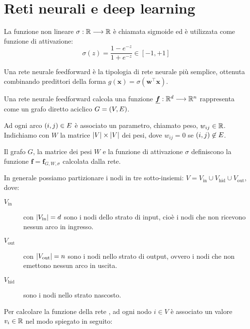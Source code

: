\documentclass[\main/main.tex]{subfiles}
\begin{document}
\chapter{Reti neurali e deep learning}
\begin{multicols}{2}
\begin{definition}[Sigmoide]
    La funzione non lineare \(\sigma:\mathbb{R}\longrightarrow \mathbb{R}\) è chiamata sigmoide ed è utilizzata come funzione di attivazione:
    \[\sigma(z)=\frac{1-e^{-z}}{1+e^{-z}} \in[-1,+1]\]
\end{definition}
\begin{definition}
    Una rete neurale feedforward è la tipologia di rete neurale più semplice, ottenuta combinando predittori della forma \(g(\boldsymbol{x})=\sigma\left(\boldsymbol{w}^{\top} \boldsymbol{x}\right)\).
    
    Una rete neurale feedforward calcola una funzione \(\funcdef{\bm{f}}{\R^d}{\R^n}\) rappresenta come un grafo diretto aciclico \(G = \left(V,E\right)\).
    
    Ad ogni arco \(\left(i,j\right) \in E\) è associato un parametro, chiamato peso, \(w_{ij} \in \mathbb{R}\). Indichiamo con \(W\) la matrice \(\left\lvert V\right\rvert \times \left\lvert V\right\rvert\) dei pesi, dove \(w_{ij} = 0\) se \(\left(i,j\right) \not\in E\).
    
    Il grafo \(G\), la matrice dei pesi \(W\) e la funzione di attivazione \(\sigma\) definiscono la funzione \(\bm{f} = \bm{f}_{G,W,\sigma}\) calcolata dalla rete.
    
    In generale possiamo partizionare i nodi in tre sotto-insiemi: \(V=V_{\mathrm{in}} \cup V_{\mathrm{hid}} \cup V_{\mathrm{out}}\), dove:
    \begin{description}
        \item[\(V_{\text{in}}\)] con \(\left\lvert V_{\text{in}}\right\rvert = d\) sono i nodi dello strato di input, cioè i nodi che non ricevono nessun arco in ingresso.
        \item[\(V_{\text{out}}\)] con \(\left\lvert V_{\text{out}}\right\rvert = n\) sono i nodi nello strato di output, ovvero i nodi che non emettono nessun arco in uscita.
        \item[\(V_{\text{hid}}\)] sono i nodi nello strato nascosto.
    \end{description}
\end{definition}
\begin{observation}
    Per calcolare la funzione della rete , ad ogni nodo \(i\in V\) è associato un valore \(v_i\in\mathbb{R}\) nel modo spiegato in seguito:
    

\end{observation}
\end{multicols}
\end{document}
